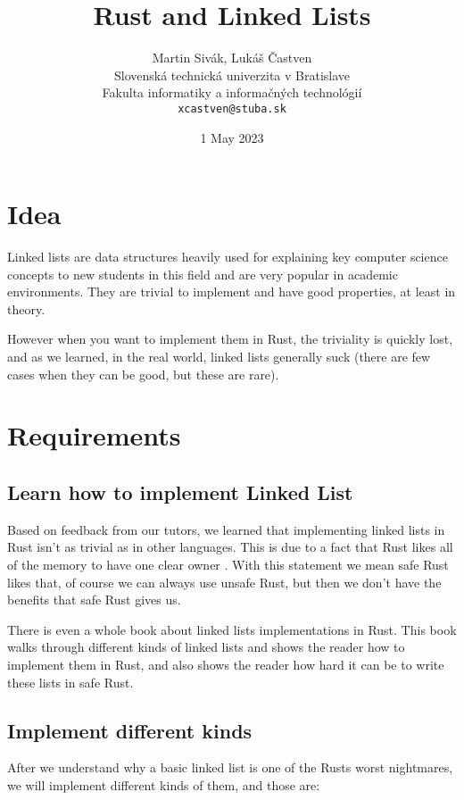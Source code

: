 \documentclass[11pt,twoside,a4paper]{article}
\title{Rust and Linked Lists}
\author{Martin Sivák, Lukáš Častven\\[2pt]
	{\small Slovenská technická univerzita v Bratislave}\\
	{\small Fakulta informatiky a informačných technológií}\\
	{\small \texttt{xcastven@stuba.sk}}
	}
\date{\small 1 May 2023}
\begin{document}
\pagestyle{plain}

\maketitle
\tableofcontents

\section{Idea}

Linked lists are data structures heavily used for explaining key computer science
concepts to new students in this field and are very popular in academic environments.
They are trivial to implement and have good properties, at least in theory.

However when you want to implement them in Rust, the triviality is quickly lost,
and as we learned, in the real world, linked lists generally suck (there are few
cases when they can be good, but these are rare).

\section{Requirements}

\subsection*{Learn how to implement Linked List}

Based on feedback from our tutors, we learned that implementing linked lists
in Rust isn't as trivial as in other languages. This is due to a fact that
Rust likes all of the memory to have one clear owner \cite{ycombinatorWritingLinked}.
With this statement we mean safe Rust likes that, of course we can always use
unsafe Rust, but then we don't have the benefits that safe Rust gives us.

There is even a whole book about linked lists implementations in Rust. This
book walks through different kinds of linked lists and shows the reader how
to implement them in Rust, and also shows the reader how hard it can be to
write these lists in safe Rust. \cite{rustunofficialIntroductionLearning}

\subsection*{Implement different kinds}

After we understand why a basic linked list is one of the Rusts worst nightmares,
we will implement different kinds of them, and those are:
\end{document}
